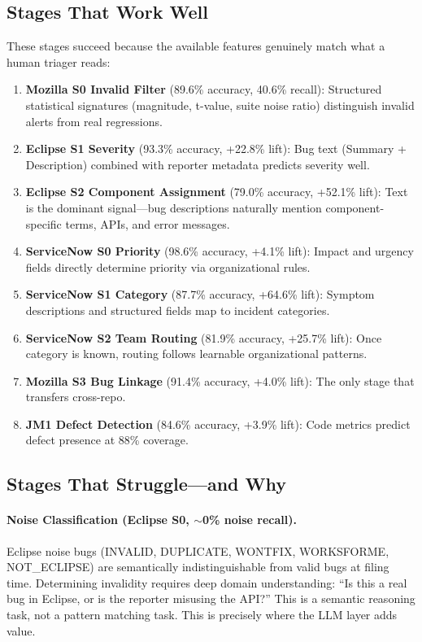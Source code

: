 \documentclass[11pt]{article}
\begin{document}
\subsection{Stages That Work Well}

These stages succeed because the available features genuinely match what a human triager reads:

\begin{enumerate}
    \item \textbf{Mozilla S0 Invalid Filter} (89.6\% accuracy, 40.6\% recall): Structured statistical signatures (magnitude, t-value, suite noise ratio) distinguish invalid alerts from real regressions.
    \item \textbf{Eclipse S1 Severity} (93.3\% accuracy, +22.8\% lift): Bug text (Summary + Description) combined with reporter metadata predicts severity well.
    \item \textbf{Eclipse S2 Component Assignment} (79.0\% accuracy, +52.1\% lift): Text is the dominant signal---bug descriptions naturally mention component-specific terms, APIs, and error messages.
    \item \textbf{ServiceNow S0 Priority} (98.6\% accuracy, +4.1\% lift): Impact and urgency fields directly determine priority via organizational rules.
    \item \textbf{ServiceNow S1 Category} (87.7\% accuracy, +64.6\% lift): Symptom descriptions and structured fields map to incident categories.
    \item \textbf{ServiceNow S2 Team Routing} (81.9\% accuracy, +25.7\% lift): Once category is known, routing follows learnable organizational patterns.
    \item \textbf{Mozilla S3 Bug Linkage} (91.4\% accuracy, +4.0\% lift): The only stage that transfers cross-repo.
    \item \textbf{JM1 Defect Detection} (84.6\% accuracy, +3.9\% lift): Code metrics predict defect presence at 88\% coverage.
\end{enumerate}

\subsection{Stages That Struggle---and Why}

\paragraph{Noise Classification (Eclipse S0, $\sim$0\% noise recall).}
Eclipse noise bugs (INVALID, DUPLICATE, WONTFIX, WORKSFORME, NOT\_ECLIPSE) are semantically indistinguishable from valid bugs at filing time. Determining invalidity requires deep domain understanding: ``Is this a real bug in Eclipse, or is the reporter misusing the API?'' This is a semantic reasoning task, not a pattern matching task. This is precisely where the LLM layer adds value.
\end{document}
